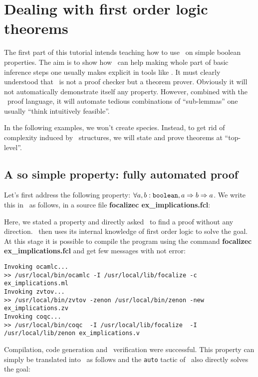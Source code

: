 \section{Dealing with first order logic theorems}

The first part of this tutorial intends teaching how to use \zenon\ on
simple boolean properties. The aim is to show how \zenon\ can help
making whole part of basic inference steps one usually makes explicit
in tools like \coq. It must clearly understood that \zenon\ is not a proof
checker but a theorem prover. Obviously it will not au\-to\-ma\-ti\-cal\-ly
demonstrate itself any property. However, combined with the \focal\
proof language, it will automate tedious combinations of ``sub-lemmas''
one usually ``think intuitively feasible''.

In the following examples, we won't create species. Instead, to get
rid of com\-ple\-xi\-ty induced by \focal\ structures, we will state and
prove theorems at ``top-level''.


\subsection{A so simple property: fully automated proof}
Let's first address the following property:
$\forall a, b : {\tt boolean}, a \Rightarrow b \Rightarrow a$.
We write this in \focal\ as follows, in a source file
\textbf{focalizec ex\_implications.fcl}:

{\scriptsize
}

Here, we stated a property and directly asked \zenon\ to find a proof
without any direction. \zenon\ then uses its internal knowledge of
first order logic to solve the goal. At this stage it is possible to
compile the program using the command \textbf{focalizec ex\_implications.fcl}
and get few messages with not error:

{\scriptsize
\begin{verbatim}
Invoking ocamlc...
>> /usr/local/bin/ocamlc -I /usr/local/lib/focalize -c ex_implications.ml
Invoking zvtov...
>> /usr/local/bin/zvtov -zenon /usr/local/bin/zenon -new ex_implications.zv
Invoking coqc...
>> /usr/local/bin/coqc  -I /usr/local/lib/focalize  -I /usr/local/lib/zenon ex_implications.v
\end{verbatim}}

Compilation, code generation and \coq\ verification were
successful. This property can simply be translated into \coq\ as
follows and the {\tt auto} tactic of \coq\ also directly solves the goal: 

